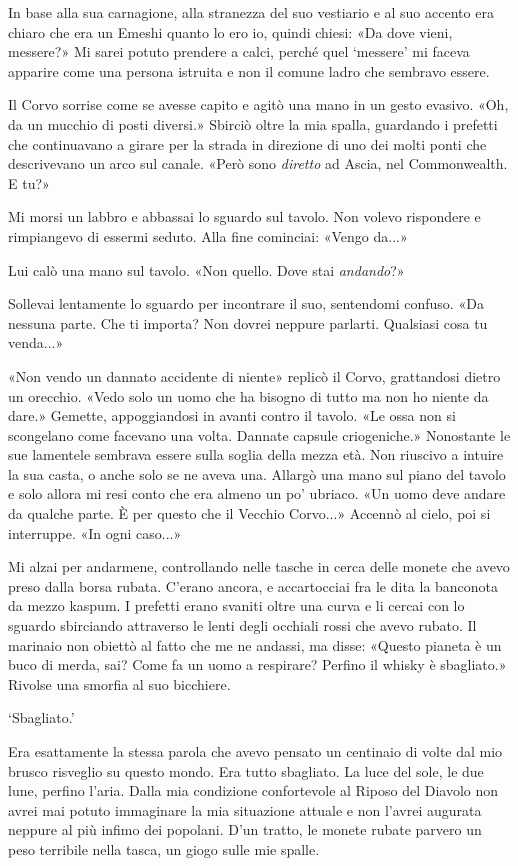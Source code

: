 In base alla sua carnagione, alla stranezza del suo vestiario e al suo
accento era chiaro che era un Emeshi quanto lo ero io, quindi chiesi:
«Da dove vieni, messere?» Mi sarei potuto prendere a calci, perché quel
`messere' mi faceva apparire come una persona istruita e non il comune
ladro che sembravo essere.

Il Corvo sorrise come se avesse capito e agitò una mano in un gesto
evasivo. «Oh, da un mucchio di posti diversi.» Sbirciò oltre la mia
spalla, guardando i prefetti che continuavano a girare per la strada in
direzione di uno dei molti ponti che descrivevano un arco sul canale.
«Però sono \emph{diretto} ad Ascia, nel Commonwealth. E tu?»

Mi morsi un labbro e abbassai lo sguardo sul tavolo. Non volevo
rispondere e rimpiangevo di essermi seduto. Alla fine cominciai: «Vengo
da...»

Lui calò una mano sul tavolo. «Non quello. Dove stai \emph{andando}?»

Sollevai lentamente lo sguardo per incontrare il suo, sentendomi
confuso. «Da nessuna parte. Che ti importa? Non dovrei neppure parlarti.
Qualsiasi cosa tu venda...»

«Non vendo un dannato accidente di niente» replicò il Corvo, grattandosi
dietro un orecchio. «Vedo solo un uomo che ha bisogno di tutto ma non ho
niente da dare.» Gemette, appoggiandosi in avanti contro il tavolo. «Le
ossa non si scongelano come facevano una volta. Dannate capsule
criogeniche.» Nonostante le sue lamentele sembrava essere sulla soglia
della mezza età. Non riuscivo a intuire la sua casta, o anche solo se ne
aveva una. Allargò una mano sul piano del tavolo e solo allora mi resi
conto che era almeno un po' ubriaco. «Un uomo deve andare da qualche
parte. È per questo che il Vecchio Corvo...» Accennò al cielo, poi si
interruppe. «In ogni caso...»

Mi alzai per andarmene, controllando nelle tasche in cerca delle monete
che avevo preso dalla borsa rubata. C'erano ancora, e accartocciai fra
le dita la banconota da mezzo kaspum. I prefetti erano svaniti oltre una
curva e li cercai con lo sguardo sbirciando attraverso le lenti degli
occhiali rossi che avevo rubato. Il marinaio non obiettò al fatto che me
ne andassi, ma disse: «Questo pianeta è un buco di merda, sai? Come fa
un uomo a respirare? Perfino il whisky è sbagliato.» Rivolse una smorfia
al suo bicchiere.

`Sbagliato.'

Era esattamente la stessa parola che avevo pensato un centinaio di volte
dal mio brusco risveglio su questo mondo. Era tutto sbagliato. La luce
del sole, le due lune, perfino l'aria. Dalla mia condizione confortevole
al Riposo del Diavolo non avrei mai potuto immaginare la mia situazione
attuale e non l'avrei augurata neppure al più infimo dei popolani. D'un
tratto, le monete rubate parvero un peso terribile nella tasca, un giogo
sulle mie spalle.


